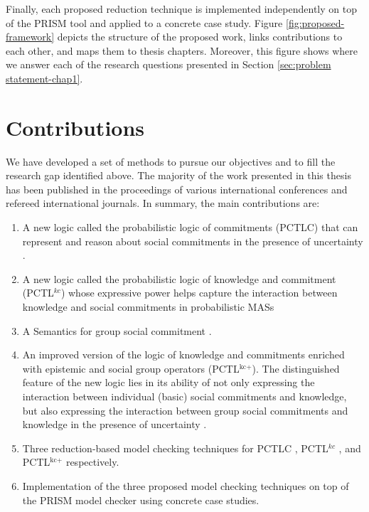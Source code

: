 Finally, each proposed reduction technique is implemented independently on top of the PRISM tool and applied to a concrete case study. 
Figure \ref{fig:proposed-framework} depicts the structure of the proposed work, links contributions to each other, and maps them to thesis chapters. Moreover, this figure shows where we answer each of the research questions presented in Section \ref{sec:problem statement-chap1}.




\section{Contributions}\label{sec:thesis-contributions-chap1}
We have developed a set of methods to pursue our objectives and to fill the research gap identified above. The majority of the work presented in this thesis has been published in the proceedings of various international conferences and refereed international journals. In summary, the main
contributions are:

\begin{enumerate}
\item A new logic called the probabilistic logic of commitments (PCTLC) that can represent and reason about social commitments in the presence of uncertainty \cite{Sultan2013}.

\item A new logic called the probabilistic logic of knowledge and commitment (PCTL$^{kc}$) whose expressive power helps capture the interaction between knowledge and social commitments in probabilistic MASs \cite{Sultan2014b}

\item A Semantics for group social commitment \cite{Sultan2014c}.

\item An improved version of the logic of knowledge and commitments enriched with epistemic and social group operators (PCTL$^{\textrm{kc+}}$). The distinguished feature of the new logic  lies in its ability of not only expressing the interaction between individual (basic) social commitments and knowledge, but also expressing the interaction between group social commitments and knowledge in the presence of uncertainty \cite{Sultan2014c}.

\item Three reduction-based model checking techniques for PCTLC \cite{Sultan2014a}, PCTL$^{kc}$ \cite{Sultan2014b}, and PCTL$^{\textrm{kc+}}$ \cite{Sultan2014d} respectively.

\item Implementation of the three proposed model checking techniques on top of the PRISM model checker using concrete case studies.

\end{enumerate}



